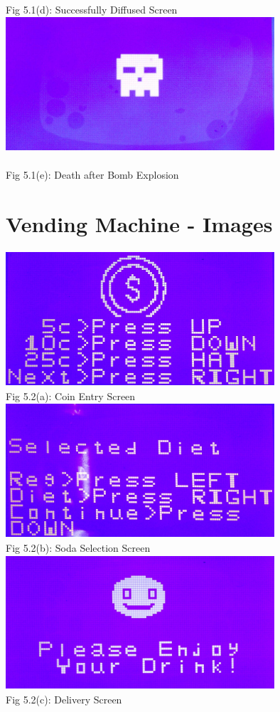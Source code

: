 \documentclass[a4paper,12pt,oneside]{book}
\begin{document}
\begin{center}
\\ {\small Fig 5.1(d): Successfully Diffused Screen} \\
\includegraphics[width=10cm, height=5cm]{TimedBombImages/deathScreen} \\
\\ {\small Fig 5.1(e): Death after Bomb Explosion} \\
\end{center}
\section{Vending Machine - Images}
\begin{center}
\includegraphics[width=10cm, height=5cm]{VendingMachineImages/COIN} \\
{\small Fig 5.2(a): Coin Entry Screen} \\
\includegraphics[width=10cm, height=5cm]{VendingMachineImages/SODASELECT} \\
{\small Fig 5.2(b): Soda Selection Screen} \\
\includegraphics[width=10cm, height=5cm]{VendingMachineImages/DELIVERY} \\
{\small Fig 5.2(c): Delivery Screen} \\
\end{center}
\end{document}
